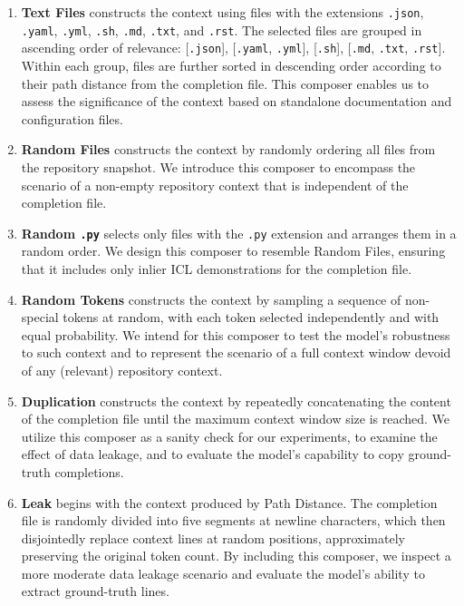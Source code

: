 \begin{enumerate}
    \item \textbf{Text Files} constructs the context using files with the extensions \texttt{.json}, \texttt{.yaml}, \texttt{.yml}, \texttt{.sh}, \texttt{.md}, \texttt{.txt}, and \texttt{.rst}. The selected files are grouped in ascending order of relevance: [\texttt{.json}], [\texttt{.yaml}, \texttt{.yml}], [\texttt{.sh}], [\texttt{.md}, \texttt{.txt}, \texttt{.rst}]. Within each group, files are further sorted in descending order according to their path distance from the completion file. This composer enables us to assess the significance of the context based on standalone documentation and configuration files.
    \item \textbf{Random Files} constructs the context by randomly ordering all files from the repository snapshot. We introduce this composer to encompass the scenario of a non-empty repository context that is independent of the completion file.
    \item \textbf{Random \texttt{.py}} selects only files with the \texttt{.py} extension and arranges them in a random order. We design this composer to resemble Random Files, ensuring that it includes only inlier ICL demonstrations for the completion file.
    \item \textbf{Random Tokens} constructs the context by sampling a sequence of non-special tokens at random, with each token selected independently and with equal probability. We intend for this composer to test the model's robustness to such context and to represent the scenario of a full context window devoid of any (relevant) repository context.
    \item \textbf{Duplication} constructs the context by repeatedly concatenating the content of the completion file until the maximum context window size is reached. We utilize this composer as a sanity check for our experiments, to examine the effect of data leakage, and to evaluate the model's capability to copy ground-truth completions.
    \item \textbf{Leak} begins with the context produced by Path Distance. The completion file is randomly divided into five segments at newline characters, which then disjointedly replace context lines at random positions, approximately preserving the original token count. By including this composer, we inspect a more moderate data leakage scenario and evaluate the model's ability to extract ground-truth lines. \parencite{sapronov2025}
\end{enumerate}

